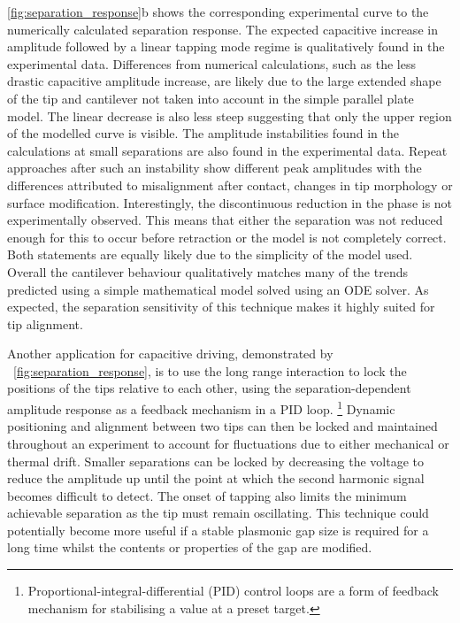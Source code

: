 \documentclass{article}
\begin{document}
\autoref{fig:separation_response}b shows the corresponding experimental curve to the numerically calculated separation response. The expected capacitive increase in amplitude followed by a linear tapping mode regime is qualitatively found in the experimental data. Differences from numerical calculations, such as the less drastic capacitive amplitude increase, are likely due to the large extended shape of the tip and cantilever not taken into account in the simple parallel plate model. The linear decrease is also less steep suggesting that only the upper region of the modelled curve is visible. The amplitude instabilities found in the calculations at small separations are also found in the experimental data. Repeat approaches after such an instability show different peak amplitudes with the differences attributed to misalignment after contact, changes in tip morphology or surface modification. Interestingly, the discontinuous reduction in the phase is not experimentally observed. This means that either the separation was not reduced enough for this to occur before retraction or the model is not completely correct. Both statements are equally likely due to the simplicity of the model used. Overall the cantilever behaviour qualitatively matches many of the trends predicted using a simple mathematical model solved using an ODE solver. As expected, the separation sensitivity of this technique makes it highly suited for tip alignment.

Another application for capacitive driving, demonstrated by \figurename~\ref{fig:separation_response}, is to use the long range interaction to lock the positions of the tips relative to each other, using the separation-dependent amplitude response as a feedback mechanism in a PID loop.%
\footnote{Proportional-integral-differential (PID) control loops are a form of feedback mechanism for stabilising a value at a preset target.}
Dynamic positioning and alignment between two tips can then be locked and maintained throughout an experiment to account for fluctuations due to either mechanical or thermal drift. Smaller separations can be locked by decreasing the voltage to reduce the amplitude up until the point at which the second harmonic signal becomes difficult to detect. The onset of tapping also limits the minimum achievable separation as the tip must remain oscillating. This technique could potentially become more useful if a stable plasmonic gap size is required for a long time whilst the contents or properties of the gap are modified.

\FloatBarrier
\end{document}
